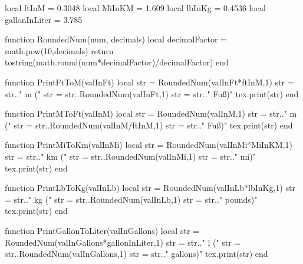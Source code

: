 \begin{luacode}
	local ftInM = 0.3048
	local MiInKM = 1.609
	local lbInKg = 0.4536
	local gallonInLiter = 3.785

	function RoundedNum(num, decimals)
		local decimalFactor = math.pow(10,decimals)
		return tostring(math.round(num*decimalFactor)/decimalFactor)
	end
	
	function PrintFtToM(valInFt)
		local str = RoundedNum(valInFt*ftInM,1)
		str = str.." m ("
		str = str..RoundedNum(valInFt,1)
		str = str.." Fuß)"
		tex.print(str)
	end
	
	function PrintMToFt(valInM)
		local str = RoundedNum(valInM,1)
		str = str.." m ("
		str = str..RoundedNum(valInM/ftInM,1)
		str = str.." Fuß)"
		tex.print(str)
	end

	function PrintMiToKm(valInMi)
		local str = RoundedNum(valInMi*MiInKM,1)
		str = str.." km ("
		str = str..RoundedNum(valInMi,1)
		str = str.." mi)"
		tex.print(str)
	end

	function PrintLbToKg(valInLb)
		local str = RoundedNum(valInLb*lbInKg,1)
		str = str.." kg ("
		str = str..RoundedNum(valInLb,1)
		str = str.." pounds)"
		tex.print(str)
	end

	function PrintGallonToLiter(valInGallons)
		local str = RoundedNum(valInGallons*gallonInLiter,1)
		str = str.." l ("
		str = str..RoundedNum(valInGallons,1)
		str = str.." gallons)"
		tex.print(str)
	end
\end{luacode}

\newcommand{\ft}[1]{
	\directlua{PrintFtToM(#1)}
}

\newcommand{\metre}[1]{
	\directlua{PrintMToFt(#1)}
}

\newcommand{\mile}[1]{
	\directlua{PrintMiToKm(#1)}
}

\newcommand{\lb}[1]{
	\directlua{PrintLbToKg(#1)}
}

\newcommand{\gallon}[1]{
	\directlua{PrintGallonToLiter(#1)}
}
